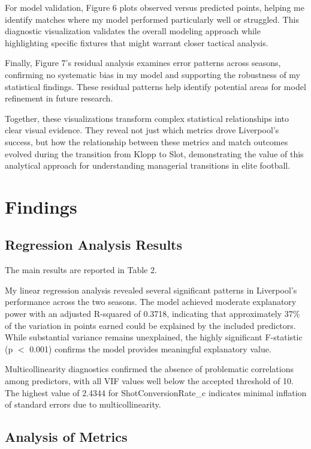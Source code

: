 \documentclass[12pt]{article}
\begin{document}
For model validation, Figure 6 plots observed versus predicted points, helping me identify matches where my model performed particularly well or struggled. This diagnostic visualization validates the overall modeling approach while highlighting specific fixtures that might warrant closer tactical analysis.

Finally, Figure 7's residual analysis examines error patterns across seasons, confirming no systematic bias in my model and supporting the robustness of my statistical findings. These residual patterns help identify potential areas for model refinement in future research.

Together, these visualizations transform complex statistical relationships into clear visual evidence. They reveal not just which metrics drove Liverpool's success, but how the relationship between these metrics and match outcomes evolved during the transition from Klopp to Slot, demonstrating the value of this analytical approach for understanding managerial transitions in elite football.

\section*{Findings}

\subsection*{Regression Analysis Results}

The main results are reported in Table 2.

My linear regression analysis revealed several significant patterns in Liverpool's performance across the two seasons. The model achieved moderate explanatory power with an adjusted R-squared of 0.3718, indicating that approximately 37\% of the variation in points earned could be explained by the included predictors. While substantial variance remains unexplained, the highly significant F-statistic (p $<$ 0.001) confirms the model provides meaningful explanatory value.

Multicollinearity diagnostics confirmed the absence of problematic correlations among predictors, with all VIF values well below the accepted threshold of 10. The highest value of 2.4344 for ShotConversionRate\_c indicates minimal inflation of standard errors due to multicollinearity.

\subsection*{Analysis of Metrics}
\end{document}
